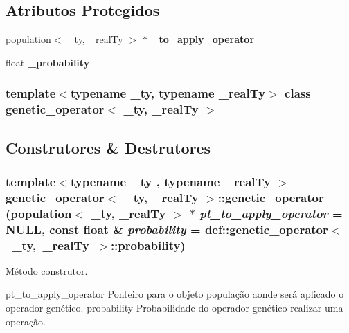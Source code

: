 \subsection*{Atributos Protegidos}
\begin{DoxyCompactItemize}
\item 
\hypertarget{classgenetic__operator_a5d8f57b5d777bb2ec2f71ab2a21847fc}{
\hyperlink{classpopulation}{population}$<$ \_\-ty, \_\-realTy $>$ $\ast$ {\bfseries \_\-to\_\-apply\_\-operator}}
\label{classgenetic__operator_a5d8f57b5d777bb2ec2f71ab2a21847fc}

\item 
\hypertarget{classgenetic__operator_a8d05857f8efcc48ba94f502b2eb7f277}{
float {\bfseries \_\-probability}}
\label{classgenetic__operator_a8d05857f8efcc48ba94f502b2eb7f277}

\end{DoxyCompactItemize}
\subsubsection*{template$<$typename \_\-ty, typename \_\-realTy$>$ class genetic\_\-operator$<$ \_\-ty, \_\-realTy $>$}



\subsection{Construtores \& Destrutores}
\hypertarget{classgenetic__operator_a114de57cea1aa2b6db81389ddf5be520}{
\subsubsection[{genetic\_\-operator}]{\setlength{\rightskip}{0pt plus 5cm}template$<$typename \_\-ty , typename \_\-realTy $>$ {\bf genetic\_\-operator}$<$ \_\-ty, \_\-realTy $>$::{\bf genetic\_\-operator} ({\bf population}$<$ \_\-ty, \_\-realTy $>$ $\ast$ {\em pt\_\-to\_\-apply\_\-operator} = {\ttfamily NULL}, \/  const float \& {\em probability} = {\ttfamily def::genetic\_\-operator$<$~\_\-ty,~\_\-realTy~$>$::probability})}}
\label{classgenetic__operator_a114de57cea1aa2b6db81389ddf5be520}
Método construtor.

pt\_\-to\_\-apply\_\-operator Ponteiro para o objeto população aonde será aplicado o operador genético.  probability Probabilidade do operador genético realizar uma operação. 

